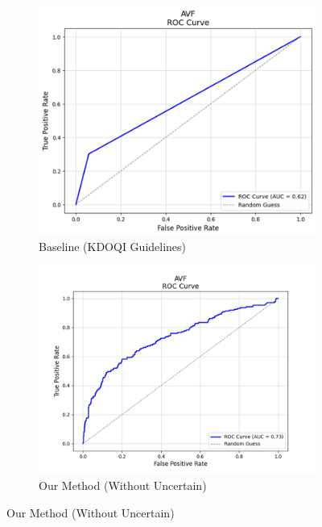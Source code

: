 \documentclass{ieeeaccess}
\begin{document}
\begin{figure}[H]
    \centering
    \begin{subfigure}[b]{0.32\textwidth} %
        \centering
        \includegraphics[width=\linewidth]{AVF_baseline_roc.png}
        \caption{Baseline (KDOQI Guidelines)}
        \label{fig:vascular-access-roc}
    \end{subfigure}
    \hfill %
    \begin{subfigure}[b]{0.32\textwidth}
        \centering
        \includegraphics[width=\linewidth]{AVF_method1_roc.png}
        \caption{Our Method (Without Uncertain)}

\end{subfigure}
\end{figure}
\end{document}

